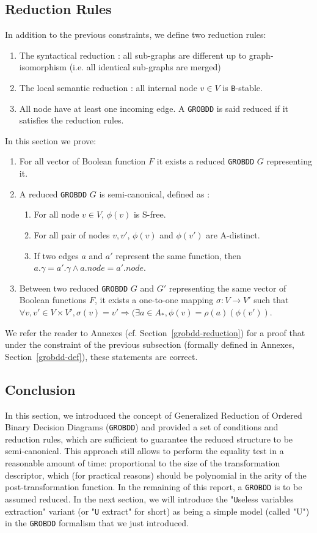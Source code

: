 \documentclass[a4paper,10pt]{article}
\newcommand{\Uextract}{"\texttt{U}seless variables extraction"}
\newcommand{\uextract}{"\texttt{U} extract"}
\newcommand{\GroBdd}{\texttt{GROBDD}}
\begin{document}
\subsection{Reduction Rules}
In addition to the previous constraints, we define two reduction rules:\begin{enumerate}
\item The syntactical reduction : all sub-graphs are different up to graph-isomorphism (i.e. all identical sub-graphs are merged)
\item The local semantic reduction : all internal node $v\in V$ is \texttt{B}-stable.
\item All node have at least one incoming edge.
A \GroBdd{} is said reduced if it satisfies the reduction rules.
\end{enumerate}
In this section we prove:\begin{enumerate}
\item For all vector of Boolean function $F$ it exists a reduced \GroBdd{} $G$ representing it.
\item A reduced \GroBdd{} $G$ is semi-canonical, defined as :\begin{enumerate}
\item For all node $v\in V$, $\phi(v)$ is S-free.
\item For all pair of nodes $v, v'$, $\phi(v)$ and $\phi(v')$ are A-distinct.
\item If two edges $a$ and $a'$ represent the same function, then $a.\gamma = a'.\gamma \land a.node = a'.node$.
\end{enumerate}
\item Between two reduced \GroBdd{} $G$ and $G'$ representing the same vector of Boolean functions $F$, it exists a one-to-one mapping $\sigma : V \longrightarrow V'$ such that $\forall v, v' \in V \times V', \sigma(v) = v' \Rightarrow (\exists a \in A_{*}, \phi(v) = \rho(a)(\phi(v'))$.
\end{enumerate}

We refer the reader to Annexes (cf. Section~\ref{grobdd-reduction}) for a proof that under the constraint of the previous subsection (formally defined in Annexes, Section~\ref{grobdd-def}), these statements are correct.

\subsection{Conclusion}

In this section, we introduced the concept of Generalized Reduction of Ordered Binary Decision Diagrams (\GroBdd{}) and provided a set of conditions and reduction rules, which are sufficient to guarantee the reduced structure to be semi-canonical.
This approach still allows to perform the equality test in a reasonable amount of time: proportional to the size of the transformation descriptor, which (for practical reasons) should be polynomial in the arity of the post-transformation function.
In the remaining of this report, a \GroBdd{} is to be assumed reduced.
In the next section, we will introduce the \Uextract{} variant (or \uextract{} for short) as being a simple model (called "U") in the \GroBdd{} formalism that we just introduced.
\end{document}
